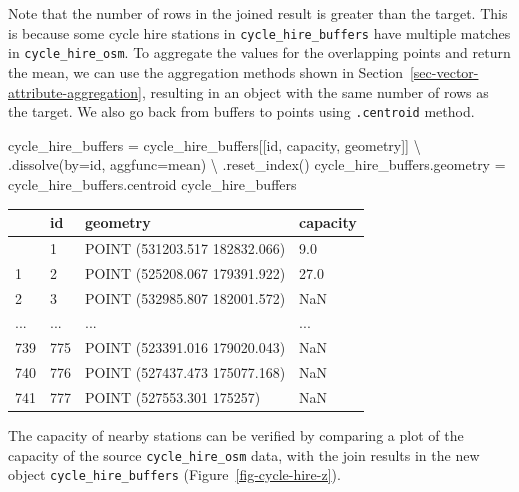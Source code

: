 \documentclass[
  letterpaper,
]{krantz}
\newenvironment{Shaded}{\begin{snugshade}}{\end{snugshade}}
\newcommand{\NormalTok}[1]{\textcolor[rgb]{0.00,0.23,0.31}{#1}}
\newcommand{\OperatorTok}[1]{\textcolor[rgb]{0.37,0.37,0.37}{#1}}
\newcommand{\StringTok}[1]{\textcolor[rgb]{0.13,0.47,0.30}{#1}}
\begin{document}
Note that the number of rows in the joined result is greater than the
target. This is because some cycle hire stations in
\texttt{cycle\_hire\_buffers} have multiple matches in
\texttt{cycle\_hire\_osm}. To aggregate the values for the overlapping
points and return the mean, we can use the aggregation methods shown in
Section~\ref{sec-vector-attribute-aggregation}, resulting in an object
with the same number of rows as the target. We also go back from buffers
to points using \texttt{.centroid} method.

\begin{Shaded}
\begin{Highlighting}[]
\NormalTok{cycle\_hire\_buffers }\OperatorTok{=}\NormalTok{ cycle\_hire\_buffers[[}\StringTok{\textquotesingle{}id\textquotesingle{}}\NormalTok{, }\StringTok{\textquotesingle{}capacity\textquotesingle{}}\NormalTok{, }\StringTok{\textquotesingle{}geometry\textquotesingle{}}\NormalTok{]] }\OperatorTok{\textbackslash{}}
\NormalTok{    .dissolve(by}\OperatorTok{=}\StringTok{\textquotesingle{}id\textquotesingle{}}\NormalTok{, aggfunc}\OperatorTok{=}\StringTok{\textquotesingle{}mean\textquotesingle{}}\NormalTok{) }\OperatorTok{\textbackslash{}}
\NormalTok{    .reset\_index()}
\NormalTok{cycle\_hire\_buffers.geometry }\OperatorTok{=}\NormalTok{ cycle\_hire\_buffers.centroid}
\NormalTok{cycle\_hire\_buffers}
\end{Highlighting}
\end{Shaded}

\begin{longtable}[]{@{}llll@{}}
\toprule\noalign{}
& id & geometry & capacity \\
\midrule\noalign{}
\endhead
\bottomrule\noalign{}
\endlastfoot
0 & 1 & POINT (531203.517 182832.066) & 9.0 \\
1 & 2 & POINT (525208.067 179391.922) & 27.0 \\
2 & 3 & POINT (532985.807 182001.572) & NaN \\
... & ... & ... & ... \\
739 & 775 & POINT (523391.016 179020.043) & NaN \\
740 & 776 & POINT (527437.473 175077.168) & NaN \\
741 & 777 & POINT (527553.301 175257) & NaN \\
\end{longtable}

The capacity of nearby stations can be verified by comparing a plot of
the capacity of the source \texttt{cycle\_hire\_osm} data, with the join
results in the new object \texttt{cycle\_hire\_buffers}
(Figure~\ref{fig-cycle-hire-z}).
\end{document}
